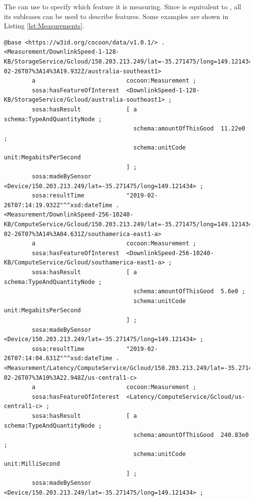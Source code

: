 The  can use  to specify which feature it is measuring. Since  is equivalent to , all its subleases can be used to describe features.
Some examples are shown in Listing \ref{lst:Measurements}.

\begin{lstlisting}[caption={Measurements},label={lst:Measurements}]
@base <https://w3id.org/cocoon/data/v1.0.1/> .
<Measurement/DownlinkSpeed-1-128-KB/StorageService/Gcloud/150.203.213.249/lat=-35.271475/long=149.121434/2019-02-26T07%3A14%3A19.932Z/australia-southeast1>
        a                          cocoon:Measurement ;
        sosa:hasFeatureOfInterest  <DownlinkSpeed-1-128-KB/StorageService/Gcloud/australia-southeast1> ;
        sosa:hasResult             [ a                        schema:TypeAndQuantityNode ;
                                     schema:amountOfThisGood  11.22e0 ;
                                     schema:unitCode          unit:MegabitsPerSecond
                                   ] ;
        sosa:madeBySensor          <Device/150.203.213.249/lat=-35.271475/long=149.121434> ;
        sosa:resultTime            "2019-02-26T07:14:19.932Z"^^xsd:dateTime .
<Measurement/DownlinkSpeed-256-10240-KB/ComputeService/Gcloud/150.203.213.249/lat=-35.271475/long=149.121434/2019-02-26T07%3A14%3A04.631Z/southamerica-east1-a>
        a                          cocoon:Measurement ;
        sosa:hasFeatureOfInterest  <DownlinkSpeed-256-10240-KB/ComputeService/Gcloud/southamerica-east1-a> ;
        sosa:hasResult             [ a                        schema:TypeAndQuantityNode ;
                                     schema:amountOfThisGood  5.6e0 ;
                                     schema:unitCode          unit:MegabitsPerSecond
                                   ] ;
        sosa:madeBySensor          <Device/150.203.213.249/lat=-35.271475/long=149.121434> ;
        sosa:resultTime            "2019-02-26T07:14:04.631Z"^^xsd:dateTime .
<Measurement/Latency/ComputeService/Gcloud/150.203.213.249/lat=-35.271475/long=149.121434/2019-02-26T07%3A10%3A22.948Z/us-central1-c>
        a                          cocoon:Measurement ;
        sosa:hasFeatureOfInterest  <Latency/ComputeService/Gcloud/us-central1-c> ;
        sosa:hasResult             [ a                        schema:TypeAndQuantityNode ;
                                     schema:amountOfThisGood  240.83e0 ;
                                     schema:unitCode          unit:MilliSecond
                                   ] ;
        sosa:madeBySensor          <Device/150.203.213.249/lat=-35.271475/long=149.121434> ;

\end{lstlisting}
